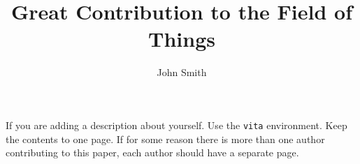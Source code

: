 \documentclass[]{afitthesis}
\title{Great Contribution to the Field of Things}
\author{John Smith}
\begin{document}
\maketitle %







\appendix %




\nocite{*} %
\printbibliography %


\begin{vita} %
    If you are adding a description about yourself. Use the \verb|vita|
    environment. Keep the contents to one page. If for some reason there is
    more than one author contributing to this paper, each author should have a
    separate page.
\end{vita}


\sfTwoNineEight %
\end{document}
